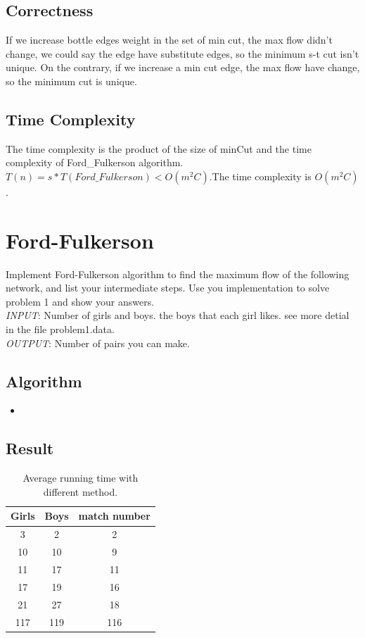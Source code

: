 \documentclass{article}
\newcommand{\pythonscript}[2]{
\begin{itemize}
\item[]
\end{itemize}
}
\numberwithin{equation}{section}
\begin{document}
    \subsection{Correctness}
    If we increase bottle edges weight in the set of min cut, the max flow didn't change, we could say the edge have substitute edges, so the minimum s-t cut isn't unique. On the contrary, if we increase a min cut edge, the max flow have change, so the minimum cut is unique.
    \subsection{Time Complexity}
    The time complexity is the product of the size of minCut and the time complexity of Ford\_Fulkerson algorithm. $T(n) = s*T(Ford\_Fulkerson) < O(m^2C)$.The time complexity is $O(m^2C)$.
%
%
\section{Ford-Fulkerson}
Implement Ford-Fulkerson algorithm to find the maximum flow of the following network, and list your intermediate steps. Use you implementation
to solve problem 1 and show your answers.\\
\emph{INPUT}: Number of girls and boys. the boys that each girl likes. see more
detial in the file problem1.data.\\
\emph{OUTPUT}: Number of pairs you can make.
    \subsection{Algorithm}
        \pythonscript{Ford_Fulkserson}{Ford\_Fulkserson Algorithm using python implement}

    \subsection{Result}
    \newpage
        \begin{table}[tbp]     
            \centering 
                \begin{tabular}{ccc}  
                \hline
                    Girls & Boys & match number  \\ 
                \hline  %
                    3  & 2 & 2  \\
                    10 & 10 & 9 \\
                    11 & 17 & 11 \\
                    17 & 19 & 16 \\
                    21 & 27 & 18 \\
                    117 & 119 & 116 \\
                    \hline
                \end{tabular}
            \caption{Average running time with different method.}
        \end{table}
%
%
\end{document}
